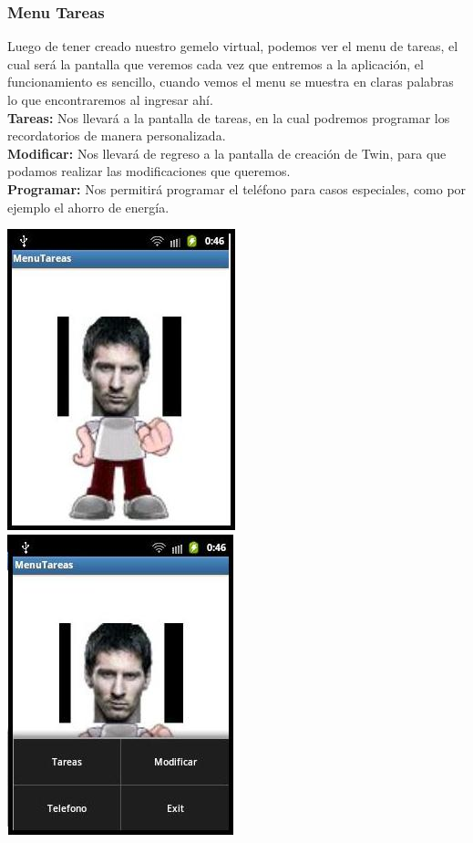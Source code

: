 \documentclass[10pt]{article}
\begin{document}
{\begin{flushleft}
\subsubsection{Menu Tareas}
Luego de tener creado nuestro gemelo virtual, podemos ver el menu de tareas, el cual ser\'a la pantalla que veremos cada vez que entremos a la aplicaci\'on, el funcionamiento es sencillo, cuando vemos el menu se muestra en claras palabras lo que encontraremos al ingresar ah\'i.\\\vspace{0.2in}
\textbf{Tareas:} Nos llevar\'a a la pantalla de tareas, en la cual podremos programar los recordatorios de manera personalizada.\\\vspace{0.1in}
\textbf{Modificar:} Nos llevar\'a de regreso a la pantalla de creaci\'on de Twin, para que podamos realizar las modificaciones que queremos.\\\vspace{0.1in}
\textbf{Programar:} Nos permitir\'a programar el tel\'efono para casos especiales, como por ejemplo el ahorro de energ\'ia.\\

\begin{center}
\vspace{0.4in}
\includegraphics[scale=0.8]{MenuTareas1.jpg}
\hspace{0.4in}\includegraphics[scale=0.8]{MenuTareas2.jpg}
\end{center}


\end{flushleft}}
\end{document}
